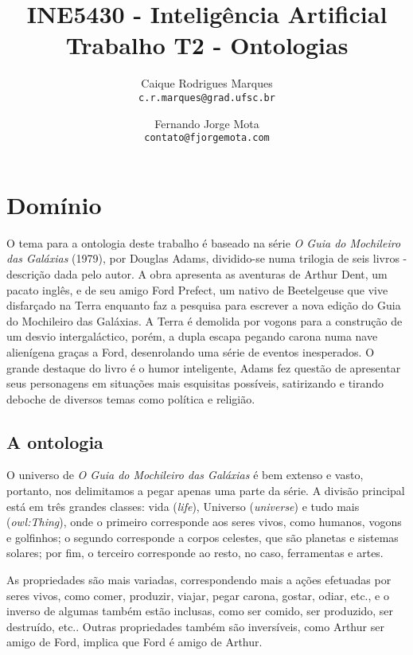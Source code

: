 \documentclass{article}
\title{\textbf{INE5430 - Inteligência Artificial \\
        \large Trabalho T2 - Ontologias}}
\author{
    Caique Rodrigues Marques \\
    {\texttt{c.r.marques@grad.ufsc.br}}
    \and
    Fernando Jorge Mota \\
    {\texttt{contato@fjorgemota.com}}
    \vspace{-5mm}
}
\date{}
\begin{document}
    \maketitle
    \section*{Domínio}
        O tema para a ontologia deste trabalho é baseado na série \textit{O
        Guia do Mochileiro das Galáxias} (1979), por Douglas Adams, dividido-se
        numa trilogia de seis livros - descrição dada pelo autor. A obra
        apresenta as aventuras de Arthur Dent, um pacato inglês, e de seu amigo
        Ford Prefect, um nativo de Beetelgeuse que vive disfarçado na Terra
        enquanto faz a pesquisa para escrever a nova edição do Guia do
        Mochileiro das Galáxias. A Terra é demolida por vogons para a
        construção de um desvio intergaláctico, porém, a dupla escapa pegando
        carona numa nave alienígena graças a Ford, desenrolando uma série de
        eventos inesperados. O grande destaque do livro é o humor inteligente,
        Adams fez questão de apresentar seus personagens em situações mais
        esquisitas possíveis, satirizando e tirando deboche de diversos temas
        como política e religião.
        
        \subsection*{A ontologia}
            O universo de \textit{O Guia do Mochileiro das Galáxias} é bem
            extenso e vasto, portanto, nos delimitamos a pegar apenas uma parte
            da série. A divisão principal está em três grandes classes: vida
            (\textit{life}), Universo (\textit{universe}) e tudo mais
            (\textit{owl:Thing}), onde o primeiro corresponde aos seres vivos,
            como humanos, vogons e golfinhos; o segundo corresponde a corpos
            celestes, que são planetas e sistemas solares; por fim, o terceiro
            corresponde ao resto, no caso, ferramentas e artes.
            
            As propriedades são mais variadas, correspondendo mais a ações
            efetuadas por seres vivos, como comer, produzir, viajar, pegar
            carona, gostar, odiar, etc., e o inverso de algumas também estão
            inclusas, como ser comido, ser produzido, ser destruído, etc..
            Outras propriedades também são inversíveis, como Arthur ser amigo
            de Ford, implica que Ford é amigo de Arthur.
            
\end{document}
